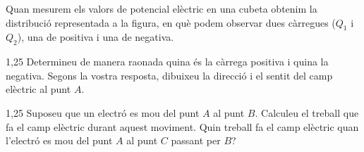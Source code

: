 Quan mesurem els valors de potencial elèctric en una cubeta obtenim la distribució representada a la figura, en què podem observar dues càrregues ($Q_1$ i $Q_2$), una de positiva i una de negativa.


\begin{apartat}{1,25}
Determineu de manera raonada quina és la càrrega positiva i quina la negativa. Segons la vostra resposta, dibuixeu la direcció i el sentit del camp elèctric al punt $A$.
\end{apartat}

\begin{apartat}{1,25}
Suposeu que un electró es mou del punt $A$ al punt $B$. Calculeu el treball que fa el camp elèctric durant aquest moviment. Quin treball fa el camp elèctric quan l'electró es mou del punt $A$ al punt $C$ passant per $B$?
\end{apartat}


